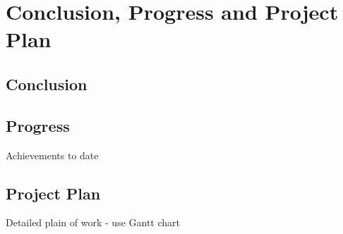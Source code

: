 
\chapter{Conclusion, Progress and Project Plan} %

\label{Chapter5} %

\section{Conclusion}

\section{Progress}

Achievements to date

\section{Project Plan}

Detailed plain of work - use Gantt chart
